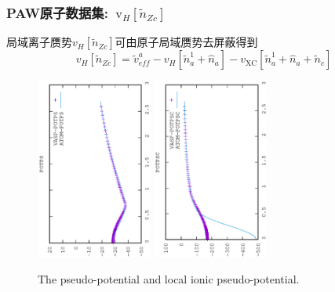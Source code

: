 \documentclass[cjk,slidestop,compress,mathserif,blue]{beamer}
\begin{document}
\frame
{
	\frametitle{\textrm{PAW}原子数据集:~$\mathrm{v}_H[\tilde n_{Zc}]$}
	局域离子赝势$v_H[\tilde n_{Zc}]$可由原子局域赝势去屏蔽得到
	$$v_H[\tilde n_{Zc}]=\tilde v_{e\!f\!f}^a-v_H[\tilde n_a^1+\hat n_a]-v_{\mathrm{XC}}[\tilde n_a^1+\hat n_a+\tilde n_c]$$
\begin{figure}[h!]
\vskip -0.5in
\centering
\hspace*{-0.1in}
\includegraphics[width=1.5in,height=2.35in,viewport=0 0 350 550, angle=-90, clip]{Figures/POTPS_data.eps}
\hspace*{-0.7in}
\includegraphics[height=2.35in,width=1.5in,viewport=0 0 350 550, angle=-90, clip]{Figures/POTPSC_data.eps}
\caption{\tiny \textrm{The pseudo-potential and local ionic pseudo-potential.}}%
\label{pseudo_potential}
\end{figure}
}
\end{document}
